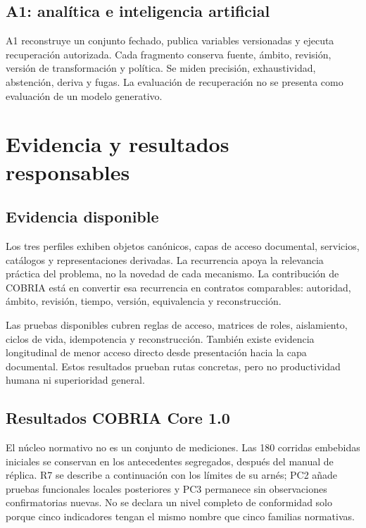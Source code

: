 \section{A1: analítica e inteligencia artificial}

A1 reconstruye un conjunto fechado, publica variables versionadas y ejecuta recuperación
autorizada. Cada fragmento conserva fuente, ámbito, revisión, versión de transformación
y política. Se miden precisión, exhaustividad, abstención, deriva y fugas. La evaluación
de recuperación no se presenta como evaluación de un modelo generativo.

\chapter{Evidencia y resultados responsables}

\section{Evidencia disponible}

Los tres perfiles exhiben objetos canónicos, capas de acceso documental, servicios,
catálogos y representaciones derivadas. La recurrencia apoya la relevancia práctica del
problema, no la novedad de cada mecanismo. La contribución de COBRIA está en convertir
esa recurrencia en contratos comparables: autoridad, ámbito, revisión, tiempo, versión,
equivalencia y reconstrucción.

Las pruebas disponibles cubren reglas de acceso, matrices de roles, aislamiento, ciclos
de vida, idempotencia y reconstrucción. También existe evidencia longitudinal de menor
acceso directo desde presentación hacia la capa documental. Estos resultados prueban
rutas concretas, pero no productividad humana ni superioridad general.

\section{Resultados COBRIA Core 1.0}

El núcleo normativo no es un conjunto de mediciones. Las 180 corridas embebidas iniciales
se conservan en los antecedentes segregados, después del manual de réplica. R7 se
describe a continuación con los límites de su arnés; PC2 añade pruebas funcionales
locales posteriores y PC3 permanece sin observaciones confirmatorias nuevas. No se
declara un nivel completo de conformidad solo porque cinco indicadores tengan el
mismo nombre que cinco familias normativas.

